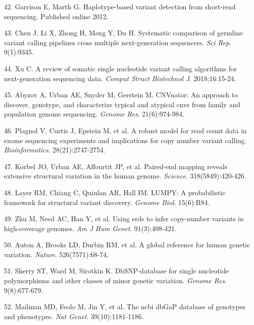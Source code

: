 \documentclass[11pt,letterpaper]{book}
\begin{document}
\leavevmode\hypertarget{ref-garrison:2012aa}{}%
42. Garrison E, Marth G. Haplotype-based variant detection from short-read sequencing. Published online 2012.

\leavevmode\hypertarget{ref-chen:2019aa}{}%
43. Chen J, Li X, Zhong H, Meng Y, Du H. Systematic comparison of germline variant calling pipelines cross multiple next-generation sequencers. \emph{Sci Rep}. 9(1):9345.

\leavevmode\hypertarget{ref-xu:2018aa}{}%
44. Xu C. A review of somatic single nucleotide variant calling algorithms for next-generation sequencing data. \emph{Comput Struct Biotechnol J}. 2018;16:15-24.

\leavevmode\hypertarget{ref-abyzov:2011aa}{}%
45. Abyzov A, Urban AE, Snyder M, Gerstein M. CNVnator: An approach to discover, genotype, and characterize typical and atypical cnvs from family and population genome sequencing. \emph{Genome Res}. 21(6):974-984.

\leavevmode\hypertarget{ref-plagnol:2012aa}{}%
46. Plagnol V, Curtis J, Epstein M, et al. A robust model for read count data in exome sequencing experiments and implications for copy number variant calling. \emph{Bioinformatics}. 28(21):2747-2754.

\leavevmode\hypertarget{ref-korbel:2007aa}{}%
47. Korbel JO, Urban AE, Affourtit JP, et al. Paired-end mapping reveals extensive structural variation in the human genome. \emph{Science}. 318(5849):420-426.

\leavevmode\hypertarget{ref-layer:2014aa}{}%
48. Layer RM, Chiang C, Quinlan AR, Hall IM. LUMPY: A probabilistic framework for structural variant discovery. \emph{Genome Biol}. 15(6):R84.

\leavevmode\hypertarget{ref-zhu:2012aa}{}%
49. Zhu M, Need AC, Han Y, et al. Using erds to infer copy-number variants in high-coverage genomes. \emph{Am J Hum Genet}. 91(3):408-421.

\leavevmode\hypertarget{ref-auton:2015aa}{}%
50. Auton A, Brooks LD, Durbin RM, et al. A global reference for human genetic variation. \emph{Nature}. 526(7571):68-74.

\leavevmode\hypertarget{ref-sherry:1999aa}{}%
51. Sherry ST, Ward M, Sirotkin K. DbSNP-database for single nucleotide polymorphisms and other classes of minor genetic variation. \emph{Genome Res}. 9(8):677-679.

\leavevmode\hypertarget{ref-mailman:2007aa}{}%
52. Mailman MD, Feolo M, Jin Y, et al. The ncbi dbGaP database of genotypes and phenotypes. \emph{Nat Genet}. 39(10):1181-1186.
\end{document}
